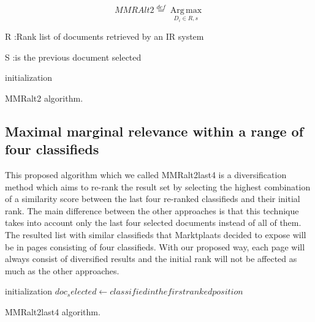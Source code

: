 \begin{equation}
MMRAlt2\overset{def}{=}\operatorname*{Arg \, \max}_{D_{i}\in R,s}
\end{equation}


R :Rank list of documents retrieved by an IR system

S :is the previous document selected

\bigskip

\begin{algorithm}[H]
 initialization\;
 \caption{MMRalt2 algorithm.}
\end{algorithm}





\subsection{Maximal marginal relevance within a range of four classifieds}

This proposed algorithm which we called MMRalt2last4 is a diversification method which aims to re-rank the result set by selecting the highest combination of a similarity score between the last four re-ranked classifieds and their initial rank. The main difference between the other approaches is that this technique takes into account only the last four selected documents instead of all of them. The resulted list with similar classifieds that Marktplaats decided to expose will be in pages consisting of four classifieds. With our proposed way, each page will always consist of diversified results and the initial rank will not be affected as much as the other approaches. 

\bigskip

\begin{algorithm}[H]
 initialization\;
 $doc_selected \gets classified in the first ranked position$
	  
 \caption{MMRalt2last4 algorithm.}
\end{algorithm}



